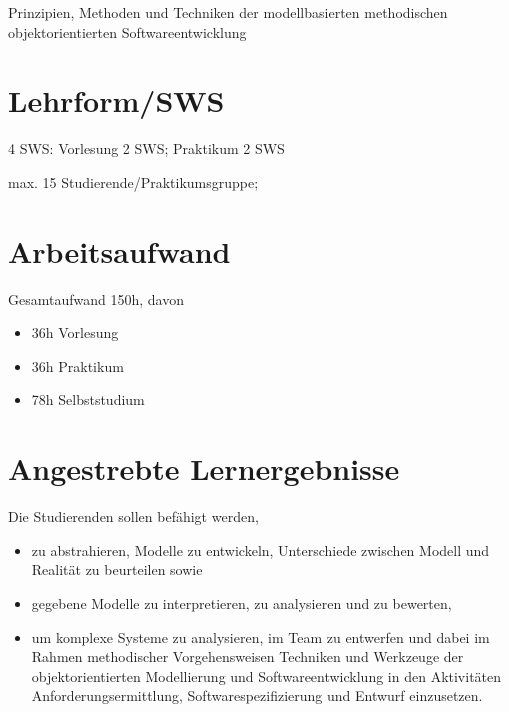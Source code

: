 Prinzipien, Methoden und Techniken der modellbasierten methodischen
objektorientierten Softwareentwicklung

\hypertarget{lehrformswspathlabelmi-2017modulbeschreibungen-bachelorba_softwaretechnik}{%
\section*{Lehrform/SWS\label{/mi-2017/modulbeschreibungen-bachelor/BA_Softwaretechnik}}\label{lehrformswspathlabelmi-2017modulbeschreibungen-bachelorba_softwaretechnik}}

4 SWS: Vorlesung 2 SWS; Praktikum 2 SWS

max. 15 Studierende/Praktikumsgruppe;

\hypertarget{arbeitsaufwandpathlabelmi-2017modulbeschreibungen-bachelorba_softwaretechnik}{%
\section*{Arbeitsaufwand\label{/mi-2017/modulbeschreibungen-bachelor/BA_Softwaretechnik}}\label{arbeitsaufwandpathlabelmi-2017modulbeschreibungen-bachelorba_softwaretechnik}}

Gesamtaufwand 150h, davon

\begin{itemize}
\tightlist
\item
  36h Vorlesung
\item
  36h Praktikum
\item
  78h Selbststudium
\end{itemize}

\hypertarget{angestrebte-lernergebnissepathlabelmi-2017modulbeschreibungen-bachelorba_softwaretechnik}{%
\section*{Angestrebte
Lernergebnisse\label{/mi-2017/modulbeschreibungen-bachelor/BA_Softwaretechnik}}\label{angestrebte-lernergebnissepathlabelmi-2017modulbeschreibungen-bachelorba_softwaretechnik}}

Die Studierenden sollen befähigt werden,

\begin{itemize}
\tightlist
\item
  zu abstrahieren, Modelle zu entwickeln, Unterschiede zwischen Modell
  und Realität zu beurteilen sowie
\item
  gegebene Modelle zu interpretieren, zu analysieren und zu bewerten,
\item
  um komplexe Systeme zu analysieren, im Team zu entwerfen und dabei im
  Rahmen methodischer Vorgehensweisen Techniken und Werkzeuge der
  objektorientierten Modellierung und Softwareentwicklung in den
  Aktivitäten Anforderungsermittlung, Softwarespezifizierung und Entwurf
  einzusetzen.
\end{itemize}

